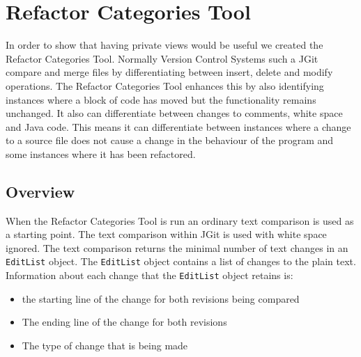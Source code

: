 
\chapter{Refactor Categories Tool}
In order to show that having private views would be useful we created the Refactor Categories Tool. Normally Version Control Systems such a JGit compare and merge files by differentiating between insert, delete and modify operations. 
The Refactor Categories Tool enhances this by also identifying instances where a block of code has moved but the functionality remains unchanged. 
It also can differentiate between changes to comments, white space and Java code. 
This means it can differentiate between instances where a change to a source file does not cause a change in the behaviour of the program and some instances where it has been refactored.  



\section{Overview}
When the Refactor Categories Tool is run an ordinary text comparison is used as a starting point.
The text comparison within JGit is used with white space ignored.
\label{matchingTextWithAST} The text comparison returns the minimal number of text changes in an \lstinline{EditList} object. 
The \lstinline{EditList} object contains a list of changes to the plain text. Information about each change that the \lstinline{EditList} object retains is:

\begin{itemize}
  \item the starting line of the change for both revisions being compared
  \item The ending line of the change for both revisions 
  \item The type of change that is being made
\end{itemize}


